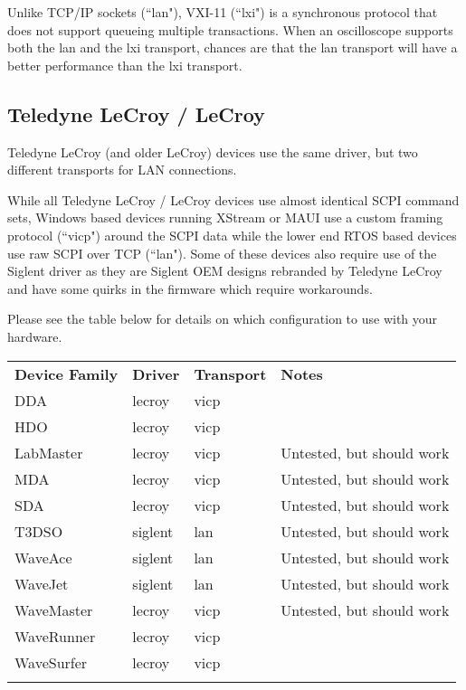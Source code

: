 Unlike TCP/IP sockets (``lan"), VXI-11 (``lxi") is a synchronous protocol that  does not support
queueing multiple transactions. When an oscilloscope supports both the lan and the lxi transport,
chances are that the lan transport will have a better performance than the lxi transport.

\subsection{Teledyne LeCroy / LeCroy}

Teledyne LeCroy (and older LeCroy) devices use the same driver, but two different transports for LAN connections.

While all Teledyne LeCroy / LeCroy devices use almost identical SCPI command sets, Windows based devices running
XStream or MAUI use a custom framing protocol (``vicp") around the SCPI data while the lower end RTOS based devices use
raw SCPI over TCP (``lan"). Some of these devices also require use of the Siglent driver as they are Siglent OEM
designs rebranded by Teledyne LeCroy and have some quirks in the firmware which require workarounds.

Please see the table below for details on which configuration to use with  your hardware.

\begin{tabularx}{16cm}{lllX}
\thickhline
\textbf{Device Family} & \textbf{Driver} & \textbf{Transport} & \textbf{Notes} \\
\thickhline
DDA & lecroy & vicp & \\
\thickhline
HDO & lecroy & vicp & \\
\thickhline
LabMaster & lecroy & vicp & Untested, but should work\\
\thickhline
MDA & lecroy & vicp & Untested, but should work\\
\thickhline
SDA & lecroy & vicp & Untested, but should work\\
\thickhline
T3DSO & siglent & lan & Untested, but should work\\
\thickhline
WaveAce & siglent & lan & Untested, but should work \\
\thickhline
WaveJet & siglent & lan & Untested, but should work \\
\thickhline
WaveMaster & lecroy & vicp & Untested, but should work \\
\thickhline
WaveRunner & lecroy & vicp & \\
\thickhline
WaveSurfer & lecroy & vicp & \\
\thickhline
\end{tabularx}

